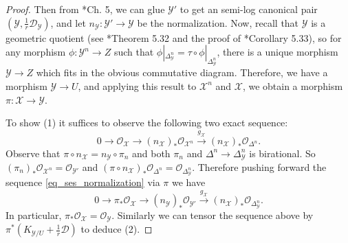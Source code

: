 \documentclass{amsart}
\newcommand{\cD}{\mathcal{D}}
\newcommand{\cO}{\mathcal{O}}
\newcommand{\cX}{\mathcal{X}}
\newcommand{\cY}{\mathcal{Y}}
\theoremstyle{definition}
\begin{document}
\begin{proof}
Then from \cite{Kol13}*{Ch. 5}, we can glue $\cY'$ to get an semi-log canonical pair $(\cY,\frac{1}{r}\cD_\cY)$, and let $n_\cY \colon \cY'\to \cY$ be the normalization.
Now, recall that $\cY$ is a geometric quotient (see \cite{Kol13}*{Theorem 5.32} and the proof of \cite{Kol13}*{Corollary 5.33}), so for any morphism $\phi \colon \cY^n\to Z$ such that $\phi|_{\Delta_\cY^n} = \tau \circ \phi|_{\Delta_\cY^n} $, there is a unique morphism $\cY\to Z$ which fits in the obvious commutative diagram.
Therefore, we have a morphism $\cY\to U$, and applying this result to $\cX^n$ and $\cX$, we obtain a morphism $\pi \colon \cX\to \cY$.


To show (1) it suffices to observe the following two exact sequence: 
\begin{equation} \label{eq_ses_normalization}
0\to \cO_\cX \to (n_{\cX})_*\cO_{\cX^n} \xrightarrow{g_\cX} (n_{\cX})_*\cO_{\Delta^n}.
\end{equation}
Observe that $\pi\circ n_\cX = n_\cY\circ\pi_n $ and both $\pi_n$ and $\Delta^n\to \Delta^n_\cY$ is birational. So $(\pi_n)_*\cO_{\cX^n} =\cO_{\cY'} $ and $(\pi\circ n_\cX)_* \cO_{\Delta^n} = \cO_{\Delta^n_\cY}.$ Therefore pushing forward the sequence \eqref{eq_ses_normalization} via $\pi$ we have
$$
0\to \pi_*\cO_\cX \to (n_{\cY})_*\cO_{\cY'} \xrightarrow{g_\cX} (n_{\cX})_*\cO_{\Delta^n_\cY}.
$$
In particular, $\pi_*\cO_{\cX}=\cO_{\cY}$. Similarly we can tensor the sequence above by $\pi^*(K_{\cY/U} + \frac{1}{r}\cD)$ to deduce (2).
\end{proof}
\end{document}
